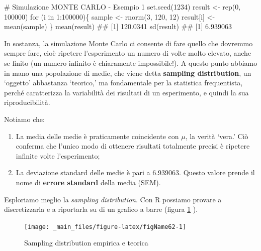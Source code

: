 \documentclass[a4paper,12pt,oneside]{book}
\providecommand{\tightlist}{%
  \setlength{\itemsep}{0pt}\setlength{\parskip}{0pt}}
\newenvironment{Shaded}{\begin{snugshade}}{\end{snugshade}}
\newcommand{\DecValTok}[1]{#1}
\newcommand{\SpecialCharTok}[1]{#1}
\newcommand{\CommentTok}[1]{#1}
\newcommand{\DocumentationTok}[1]{#1}
\newcommand{\OtherTok}[1]{#1}
\newcommand{\FunctionTok}[1]{#1}
\newcommand{\ControlFlowTok}[1]{#1}
\newcommand{\NormalTok}[1]{#1}
\begin{document}
\begin{Shaded}
\begin{Highlighting}[]
\CommentTok{\# Simulazione MONTE CARLO {-} Esempio 1}
\FunctionTok{set.seed}\NormalTok{(}\DecValTok{1234}\NormalTok{)}
\NormalTok{result }\OtherTok{\textless{}{-}} \FunctionTok{rep}\NormalTok{(}\DecValTok{0}\NormalTok{, }\DecValTok{100000}\NormalTok{)}
\ControlFlowTok{for}\NormalTok{ (i }\ControlFlowTok{in} \DecValTok{1}\SpecialCharTok{:}\DecValTok{100000}\NormalTok{)\{}
\NormalTok{  sample }\OtherTok{\textless{}{-}} \FunctionTok{rnorm}\NormalTok{(}\DecValTok{3}\NormalTok{, }\DecValTok{120}\NormalTok{, }\DecValTok{12}\NormalTok{)}
\NormalTok{  result[i] }\OtherTok{\textless{}{-}} \FunctionTok{mean}\NormalTok{(sample)}
\NormalTok{\}}
\FunctionTok{mean}\NormalTok{(result)}
\DocumentationTok{\#\# [1] 120.0341}
\FunctionTok{sd}\NormalTok{(result)}
\DocumentationTok{\#\# [1] 6.939063}
\end{Highlighting}
\end{Shaded}

In sostanza, la simulazione Monte Carlo ci consente di fare quello che dovremmo sempre fare, cioè ripetere l'esperimento un numero di volte molto elevato, anche se finito (un numero infinito è chiaramente impossibile!). A questo punto abbiamo in mano una popolazione di medie, che viene detta \textbf{sampling distribution}, un `oggetto' abbastanza `teorico,' ma fondamentale per la statistica frequentista, perché caratterizza la variabilità dei risultati di un esperimento, e quindi la sua riproducibilità.

Notiamo che:

\begin{enumerate}
\def\labelenumi{\arabic{enumi}.}
\tightlist
\item
  La media delle medie è praticamente coincidente con \(\mu\), la verità `vera.' Ciò conferma che l'unico modo di ottenere risultati totalmente precisi è ripetere infinite volte l'esperimento;
\item
  La deviazione standard delle medie è pari a 6.939063. Questo valore prende il nome di \textbf{errore standard} della media (SEM).
\end{enumerate}

Esploriamo meglio la \emph{sampling distribution}. Con R possiamo provare a discretizzarla e a riportarla su di un grafico a barre (figura \ref{fig:figName62} ).

\begin{figure}

{\centering \texttt{[image: \_main\_files/figure-latex/figName62-1]} 

}

\caption{Sampling distribution empirica e teorica}\label{fig:figName62}
\end{figure}
\end{document}
